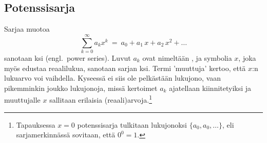 \subsection*{Potenssisarja} 

Sarjaa muotoa
\[
\sum_{k=0}^\infty a_k x^k\ =\ a_0 + a_1\,x + a_2\,x^2 + \ldots
\]
sanotaan ksi (engl.\ power series). Luvut $a_k$ ovat nimeltään 
%
, ja symbolia $x$, joka myös edustaa reaalilukua, sanotaan sarjan
ksi. Termi 'muuttuja' kertoo, että $x$:n lukuarvo voi vaihdella. Kyseessä ei siis
ole pelkästään lukujono, vaan pikemminkin joukko lukujonoja, missä kertoimet $a_k$ ajatellaan 
kiinnitetyiksi ja muuttujalle $x$ sallitaan erilaisia (reaali)arvoja.\footnote[2]{Tapauksessa
$x=0$ potenssisarja tulkitaan lukujonoksi $\{a_0,a_0,\ldots\}$, eli sarjamerkinnässä sovitaan,
että $0^0=1$.}

